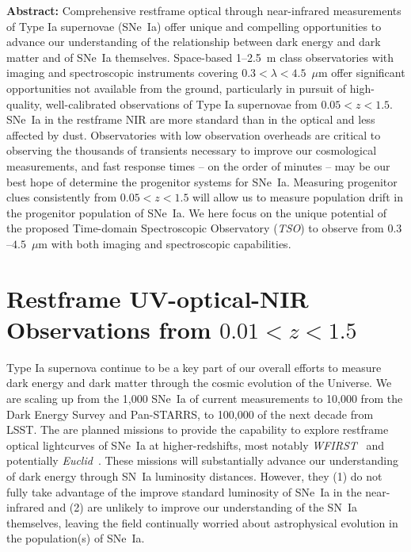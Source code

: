 \documentclass[12pt,preprint]{aastex}
\newcommand{\snia}{SN~Ia\xspace}
\newcommand{\sneia}{SNe~Ia\xspace}
\begin{document}
\textbf{Abstract:}
    Comprehensive restframe optical through near-infrared measurements of Type Ia supernovae (\sneia) offer unique and compelling opportunities to advance our understanding of the relationship between dark energy and dark matter and of \sneia themselves.
    Space-based 1--2.5~m class observatories with imaging and spectroscopic instruments covering $0.3<\lambda<4.5$~$\mu$m offer significant opportunities not available from the ground, particularly in pursuit of high-quality, well-calibrated observations of Type Ia supernovae from $0.05<z<1.5$.
    \sneia in the restframe NIR are more standard than in the optical and less affected by dust.
    Observatories with low observation overheads are critical to observing the thousands of transients necessary to improve our cosmological measurements, and fast response times -- on the order of minutes -- may be our best hope of determine the progenitor systems for \sneia.
    Measuring progenitor clues consistently from $0.05<z<1.5$ will allow us to measure population drift in the progenitor population of \sneia.
    We here focus on the unique potential of the proposed Time-domain Spectroscopic Observatory ({\it TSO}) to observe from $0.3$--$4.5$~$\mu$m with both imaging and spectroscopic capabilities.


\pagebreak
\setcounter{page}{1}
\section{Restframe UV-optical-NIR Observations from $0.01<z<1.5$}

Type Ia supernova continue to be a key part of our overall efforts to measure dark energy and dark matter through the cosmic evolution of the Universe.  We are scaling up from the 1,000 \sneia of current measurements to 10,000 from the Dark Energy Survey and Pan-STARRS, to 100,000 of the next decade from LSST.  The are planned missions to provide the capability to explore restframe optical lightcurves of \sneia at higher-redshifts, most notably {\it WFIRST}~\citep{Spergel15,Hounsell18} and potentially {\it Euclid}~\citep{Astier14}.  These missions will substantially advance our understanding of dark energy through \snia luminosity distances.  However, they (1) do not fully take advantage of the improve standard luminosity of \sneia in the near-infrared and (2) are unlikely to improve our understanding of the \snia themselves, leaving the field continually worried about astrophysical evolution in the population(s) of \sneia.
\end{document}
